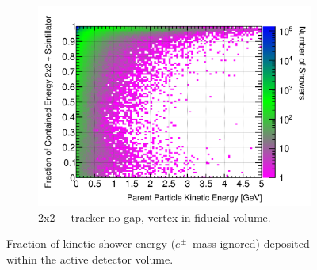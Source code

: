 \documentclass[10pt,a4paper,openany]{article}
\begin{document}
\begin{figure}[htbp]
\begin{subfigure}[b]{0.49\textwidth}
		\includegraphics[width=1.0\textwidth]{EM_contained_frac_2x2_Scintillator_fiducial.png}
		\caption{2x2 + tracker no gap, vertex in fiducial volume.}
		\label{}
	\end{subfigure}	
  \caption{Fraction of kinetic shower energy ($e^{\pm}$~mass ignored) deposited within the active detector volume.}
\end{figure}
\end{document}
